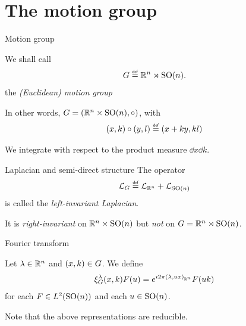 \documentclass{beamer}
\begin{document}
\section{The motion group}

\begin{frame}{Motion group}
    \begin{definition}
        We shall call
        \begin{align*}
            \Group \defeq \R^n \rtimes \SpecialOrthogonalGroup n.
        \end{align*}
        the \emph{(Euclidean) motion group}
    \end{definition}

    \pause

    In other words, $G = (\R^n \times \SpecialOrthogonalGroup n, \circ)$,
    with
    \begin{align*}
        (x, k) \circ (y, l) \defeq (x + k y, k l)
    \end{align*}

    \pause

    We integrate with respect to the product measure $\dd x \dd k$.
\end{frame}

\begin{frame}{Laplacian and semi-direct structure}
    The operator
    \begin{align*}
        \Laplacian \defeq \Laplacian [\R^n] + \Laplacian [\SpecialOrthogonalGroup n]
    \end{align*}
    is called the \emph{left-invariant Laplacian}.

    \pause

    It is \emph{right-invariant} on $\R^n \times \SpecialOrthogonalGroup n$
    but \emph{not} on $\Group = \R^n \rtimes \SpecialOrthogonalGroup n$.
\end{frame}

\begin{frame}{Fourier transform}
    \begin{definition}[Representations]
        Let $\lambda \in \R^n$ and $(x, k) \in \Group$.
        We define
        \begin{align*}
            \Rep \lambda(x, k) F(u)
            = \e^{\i \turn \ip [\R^n] \lambda {u x}} F(u k)
        \end{align*}
        for each $F \in \Lebesgue 2 {\SpecialOrthogonalGroup n}$ and each $u \in \SpecialOrthogonalGroup n$.
    \end{definition}

    Note that the above representations are reducible.
\end{frame}
\end{document}
